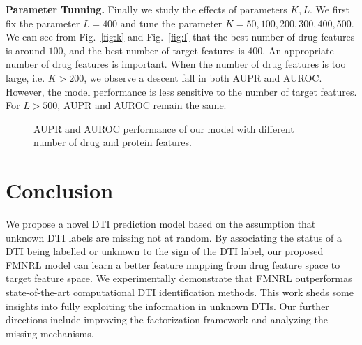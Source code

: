 \documentclass[sigconf,anonymous]{acmart}
\begin{document}
\textbf{Parameter Tunning.} Finally we study the effects of parameters $K,L$. We first fix the parameter $L=400$ and tune the parameter $K=50,100,200,300,400,500$. We can see from Fig.~\ref{fig:k} and Fig.~\ref{fig:l} that the best number of drug features is around $100$, and the best number of target features is $400$. An appropriate number of drug features is important. When the number of drug features is too large, i.e. $K>200$, we observe a descent fall in both AUPR and AUROC. However, the model performance is less sensitive to the number of target features. For $L>500$, AUPR and AUROC remain the same.   

\begin{figure}[!ht]
\centering
{}
\vspace*{-10pt}
\caption{AUPR and AUROC performance of our model with different number of drug and protein features.}\label{fig:parameter}
\end{figure}



\section{Conclusion}\label{sec:conclusion}

We propose a novel DTI prediction model based on the assumption that unknown DTI labels are missing not at random. By associating the status of a DTI being labelled or unknown to the sign of the DTI label, our proposed FMNRL model can learn a better feature mapping from drug feature space to target feature space. We experimentally demonstrate that FMNRL outperformas state-of-the-art computational DTI identification methods. This work sheds some insights into fully exploiting the information in unknown DTIs. Our further directions include improving the factorization framework and analyzing the missing mechanisms. 
\end{document}
